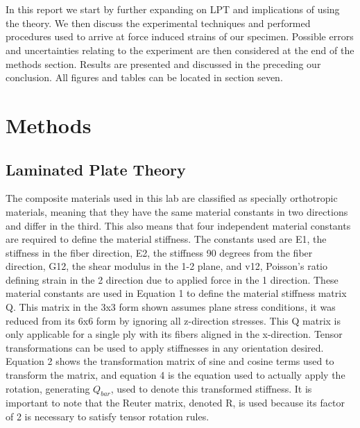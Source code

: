\documentclass[12pt]{article}
\begin{document}
\\  \\
In this report we start by further expanding on LPT and implications of using the theory.  We then discuss the experimental techniques and performed procedures used to arrive at force induced strains of our specimen. Possible errors and uncertainties  relating to the experiment are then considered at the end of the methods section. Results are presented and discussed in the preceding our conclusion. All figures and tables can be located in section seven. 


\section{Methods}

\subsection{Laminated Plate Theory} %

The composite materials used in this lab are classified as specially orthotropic materials, meaning that they have the same material constants in two directions and differ in the third. This also means that four independent material constants are required to define the material stiffness. The constants used are E1, the stiffness in the fiber direction, E2, the stiffness 90 degrees from the fiber direction, G12, the shear modulus in the 1-2 plane, and v12, Poisson's ratio defining strain in the 2 direction due to applied force in the 1 direction. These material constants are used in Equation 1 to define the material stiffness matrix Q. This matrix in the 3x3 form shown assumes plane stress conditions, it was reduced from its 6x6 form by ignoring all z-direction stresses. This Q matrix is only applicable for a single ply with its fibers aligned in the x-direction. Tensor transformations can be used to apply stiffnesses in any orientation desired. Equation 2 shows the transformation matrix of sine and cosine terms used to transform the matrix, and equation 4 is the equation used to actually apply the rotation, generating $Q_{bar}$, used to denote this transformed stiffness. It is important to note that the Reuter matrix, denoted R, is used because its factor of 2 is necessary to satisfy tensor rotation rules.
\end{document}
